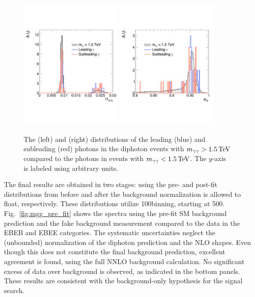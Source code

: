 \begin{figure}[!hbt]
  \centering
  \includegraphics[width=0.45\textwidth]{figures/sieie_all_edit.pdf}
  \includegraphics[width=0.45\textwidth]{figures/R9_all_edit.pdf}
  \caption{The \sieie (left) and \rnine (right) distributions of the leading (blue) and subleading (red) photons in the diphoton events with $m_{\gamma\gamma}>1.5\,\text{Te\hspace{-.08em}V}$ compared to the photons in events with $m_{\gamma\gamma} < 1.5\,\text{Te\hspace{-.08em}V}$. The $y$-axis is labeled using arbitrary units.}
  \label{fig:high_mass_sieie_r9}
\end{figure}

The final results are obtained in two stages: using the pre- and post-fit \mgg distributions from before and after the background normalization is allowed to float, respectively. These distributions utilize 100\GeV binning, starting at 500\GeV. Fig.~\ref{fig:mgg_pre_fit} shows the \mgg spectra using the pre-fit SM background prediction and the fake background measurement compared to the data in the EBEB and EBEE categories. The systematic uncertainties neglect the (unbounded) normalization of the diphoton prediction and the NLO shapes. Even though this does not constitute the final background prediction, excellent agreement is found, using the full NNLO background calculation. No significant excess of data over background is observed, as indicated in the bottom panels. These results are consistent with the background-only hypothesis for the signal search.

